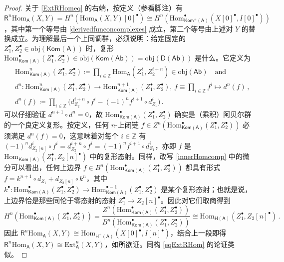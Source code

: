 \begin{proof}
	关于 \eqref{ExtRHomeq} 的右端，按定义（参看脚注）有 $\mathsf{R}^n\text{Hom}_\mathsf{A}(X,Y)\!=\!H^n(\text{Hom}_\mathsf{A}(X,Y)[0]^\bullet)\!\cong\! H^n(\text{Hom}_\mathsf{Kom^+(A)}^\bullet(X[0]^\bullet,I[0]^\bullet))$，其中第一个等号由 \eqref{derivedfunconcomplexes} 成立，第二个等号由上述对 $Y$ 的替换成立。为理解最后一个上同调群，必须说明：给定固定的 $Z_1^\bullet, Z_2^\bullet\in\text{obj}(\mathsf{Kom(A)})$ 时，复形 $\text{Hom}_\mathsf{Kom(A)}^\bullet(Z_1^\bullet,Z_2^\bullet)\in\text{obj}(\mathsf{Kom(Ab)})=\text{obj}(\mathsf{D(Ab)})$ 是什么。它定义为
	\begin{align}\label{innerHomcomp}
		& \text{Hom}_\mathsf{Kom(A)}^n(Z_1^\bullet, Z_2^\bullet)\coloneqq\prod_{i\in\mathbb{Z}}\text{Hom}_\mathsf{A}(Z_1^i,Z_2^{i+n})\in\text{obj}(\mathsf{Ab})\quad\text{and}\nonumber \\
		& d^n:\text{Hom}_\mathsf{Kom(A)}^n(Z_1^\bullet, Z_2^\bullet)\rightarrow \text{Hom}_\mathsf{Kom(A)}^{n+1}(Z_1^\bullet, Z_2^\bullet),\, f\equiv \prod_{i\in\mathbb{Z}}f^i\mapsto d^n(f)\,,\\
		& d^n(f)\coloneqq\prod_{i\in\mathbb{Z}}\big(d_{Z_2}^{i+n}\circ f^i -(-1)^nf^{i+1}\circ d_{Z_1}^i\big)\,. \nonumber
	\end{align}
	可以仔细验证 $d^{n+1}\circ d^n=0$，故 $\text{Hom}_\mathsf{Kom(A)}^\bullet(Z_1^\bullet,Z_2^\bullet)$ 确实是（乘积）阿贝尔群的一个良定义复形。按定义，任何 $n$-上闭链 $f\in Z^n(\text{Hom}_\mathsf{Kom(A)}^\bullet(Z_1^\bullet,Z_2^\bullet))$ 必须满足 $d^n(f)=0$，这意味着对每个 $i\in\mathbb{Z}$ 有 $(-1)^n d_{Z_2[n]}^i\circ f^i= d_{Z_2}^{i+n}\circ f^i = (-1)^n f^{i+1}\circ d_{Z_1}^i$，亦即 $f$ 是 $\text{Hom}_\mathsf{Kom(A)}(Z_1^\bullet,Z_2[n]^\bullet)$ 中的复形态射。同样，改写 \eqref{innerHomcomp} 中的微分可以看出，任何上边界 $f\in B^n(\text{Hom}_\mathsf{Kom(A)}^\bullet(Z_1^\bullet,Z_2^\bullet))$ 都具有形式 $f=k^{n+1}\circ d_{Z_1} +d_{Z_2[n]}\circ k^n$，其中 $k^\bullet:\text{Hom}_\mathsf{Kom(A)}^\bullet(Z_1^\bullet,Z_2^\bullet)\rightarrow \text{Hom}_\mathsf{Kom(A)}^{\bullet-1}(Z_1^\bullet,Z_2^\bullet)$ 是某个复形态射；也就是说，上边界恰是那些同伦于零态射的态射 $Z_1^\bullet\rightarrow Z_2[n]^\bullet$。因此对它们取商得到
	\[
	H^n(\text{Hom}_\mathsf{Kom(A)}^\bullet(Z_1^\bullet,Z_2^\bullet))=\frac{Z^n(\text{Hom}_\mathsf{Kom(A)}^\bullet(Z_1^\bullet,Z_2^\bullet))}{B^n(\text{Hom}_\mathsf{Kom(A)}^\bullet(Z_1^\bullet,Z_2^\bullet))}\cong\text{Hom}_\mathsf{H(A)}(Z_1^\bullet,Z_2[n]^\bullet)\,.
	\]
	因此 $\mathsf{R}^n\text{Hom}_\mathsf{A}(X,Y)\cong\text{Hom}_\mathsf{H^+(A)}(X[0]^\bullet,I[n]^\bullet)$，结合上一段即得 $\mathsf{R}^n\text{Hom}_\mathsf{A}(X,Y)\cong\text{Ext}_\mathsf{A}^n(X,Y)$，如所欲证。同构 \eqref{eqExtRHom} 的论证类似。
\end{proof}

